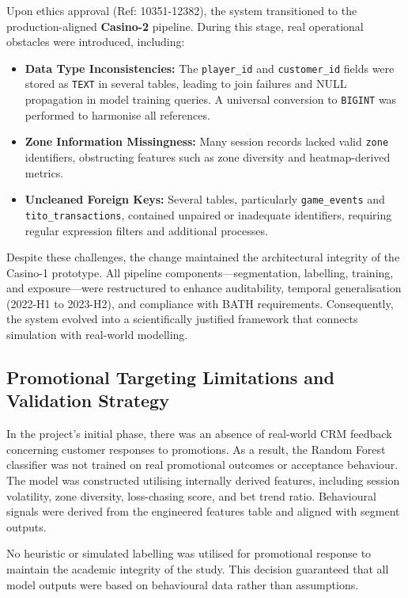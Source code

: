 \documentclass[12pt,a4paper]{report}
\begin{document}
Upon ethics approval (Ref: 10351-12382), the system transitioned to the production-aligned \textbf{Casino-2} pipeline. During this stage, real operational obstacles were introduced, including:

\begin{itemize}
  \item \textbf{Data Type Inconsistencies:} The \texttt{player\_id} and \texttt{customer\_id} fields were stored as \texttt{TEXT} in several tables, leading to join failures and NULL propagation in model training queries. A universal conversion to \texttt{BIGINT} was performed to harmonise all references.
  \item \textbf{Zone Information Missingness:} Many session records lacked valid \texttt{zone} identifiers, obstructing features such as zone diversity and heatmap-derived metrics.
  \item \textbf{Uncleaned Foreign Keys:} Several tables, particularly \texttt{game\_events} and \texttt{tito\_transactions}, contained unpaired or inadequate identifiers, requiring regular expression filters and additional processes.
\end{itemize}

Despite these challenges, the change maintained the architectural integrity of the Casino-1 prototype.  All pipeline components—segmentation, labelling, training, and exposure—were restructured to enhance auditability, temporal generalisation (2022-H1 to 2023-H2), and compliance with BATH requirements.  Consequently, the system evolved into a scientifically justified framework that connects simulation with real-world modelling.

\subsection{Promotional Targeting Limitations and Validation Strategy}

In the project's initial phase, there was an absence of real-world CRM feedback concerning customer responses to promotions.  As a result, the Random Forest classifier was not trained on real promotional outcomes or acceptance behaviour.  The model was constructed utilising internally derived features, including session volatility, zone diversity, loss-chasing score, and bet trend ratio.  Behavioural signals were derived from the engineered features table and aligned with segment outputs.

 No heuristic or simulated labelling was utilised for promotional response to maintain the academic integrity of the study.  This decision guaranteed that all model outputs were based on behavioural data rather than assumptions.
\end{document}
